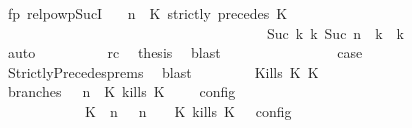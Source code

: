 \begin{isabellebody}
\ fp\ relpowp{\isacharunderscore}Suc{\isacharunderscore}I{}\ \isamarkupfalse%
\ {\isacartoucheopen}{\isacharparenleft}{\isasymGamma}{\isacharcomma}\ n\ {\isasymturnstile}\ {\isacharparenleft}{\isacharparenleft}K\ strictly\ precedes\ K\ {\isacharhash}\ {\isasymPsi}{\isacharparenright}\ {\isasymtriangleright}\ {\isasymPhi}{\isacharparenright}\isanewline
\ \ \ \ \ \ \ \ \ \ \ \ \ \ \ \ \ \ \ \ \ \ \ \ \ \ \ \ \ \ \ \ \ \ \ \ \ \ {\isasymhookrightarrow}\isactrlbsup Suc\ k\isactrlesup \ {\isacharparenleft}{\isasymGamma}\isactrlsub k{\isacharcomma}\ Suc\ n\ {\isasymturnstile}\ {\isasymPsi}\isactrlsub k\ {\isasymtriangleright}\ {\isasymPhi}\isactrlsub k{\isacharparenright}{\isacartoucheclose}\isanewline
\ \ \ \ \ \ \ \ \ \ \isamarkupfalse%
\ auto\isanewline
\ \ \ \ \ \ \ \ \isamarkupfalse%
\ rc\ \isamarkupfalse%
\ {\isacharquery}thesis\ \isamarkupfalse%
\ blast\isanewline
\ \ \ \ \ \ \isamarkupfalse%
\isanewline
\ \ \ \ \ \ \isamarkupfalse%
\ \isamarkupfalse%
\ {\isacharquery}case\ \isamarkupfalse%
\ StrictlyPrecedes{\isachardot}prems{\isacharparenleft}{}{\isacharparenright}\ \isamarkupfalse%
\ blast\isanewline
\ \ \isamarkupfalse%
\isanewline
\ \ \ \ \isamarkupfalse%
\ {\isacharparenleft}Kills\ K\ K\isanewline
\ \ \ \ \ \ \isamarkupfalse%
\ branches{\isacharcolon}\ {\isacartoucheopen}{\isasymlbrakk}\ {\isasymGamma}{\isacharcomma}\ n\ {\isasymturnstile}\ {\isacharparenleft}{\isacharparenleft}K\ kills\ K\ {\isacharhash}\ {\isasymPsi}{\isacharparenright}\ {\isasymtriangleright}\ {\isasymPhi}\ {\isasymrbrakk}\isactrlsub c\isactrlsub o\isactrlsub n\isactrlsub f\isactrlsub i\isactrlsub g\isanewline
\ \ \ \ \ \ \ \ \ \ {\isacharequal}\ {\isasymlbrakk}\ {\isacharparenleft}{\isacharparenleft}K\ {\isasymnot}{\isasymUp}\ n{\isacharparenright}\ {\isacharhash}\ {\isasymGamma}{\isacharparenright}{\isacharcomma}\ n\ {\isasymturnstile}\ {\isasymPsi}\ {\isasymtriangleright}\ {\isacharparenleft}{\isacharparenleft}K\ kills\ K\ {\isacharhash}\ {\isasymPhi}{\isacharparenright}\ {\isasymrbrakk}\isactrlsub c\isactrlsub o\isactrlsub n\isactrlsub f\isactrlsub i\isactrlsub g\isanewline

\end{isabellebody}
